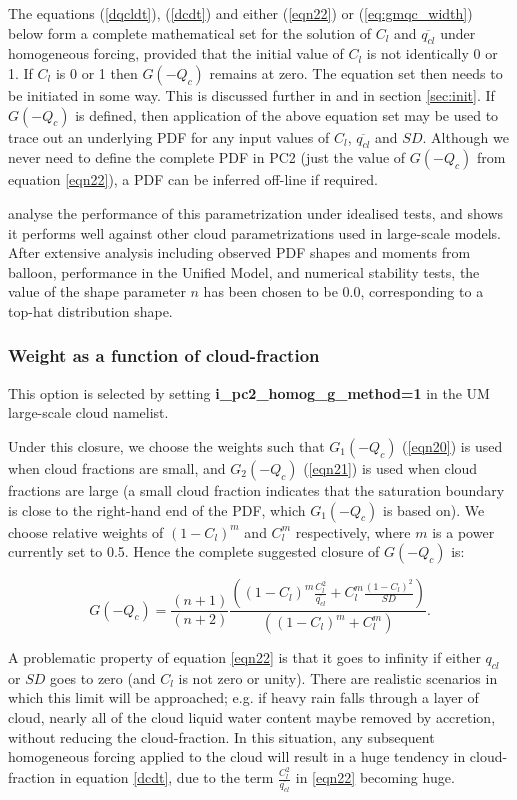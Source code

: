 \documentclass{UMDP_article}
\begin{document}
The equations (\ref{dqcldt}), (\ref{dcdt}) and  either (\ref{eqn22})
or (\ref{eq:gmqc_width}) below form a
complete mathematical set for the solution of $C_l$ and $\overline{q_{cl}}$
under homogeneous forcing, provided that the initial value of $C_l$ is not
identically 0 or 1. If $C_l$ is 0 or 1 then $G(-Q_c)$ remains at zero. The
equation set then needs to be initiated in some way. This is discussed further
in \cite{wg03} and in section \ref{sec:init}. If $G(-Q_c)$ is defined,
then application of the above equation set may be used to trace out an
underlying PDF for any input values of $C_l$, $\overline{q_{cl}}$ and $SD$.
Although we never need to define the complete PDF in PC2 (just the
value of $G(-Q_c)$ from equation \ref{eqn22}), a PDF can be
inferred off-line if required.

\cite{wg03} analyse the performance of this parametrization
under idealised tests, and shows it performs well against other
cloud parametrizations used in large-scale models. After extensive
analysis including observed PDF shapes and moments from balloon,
performance in the Unified Model, and numerical stability tests,
the value of the
shape parameter $n$ has been chosen to be 0.0, corresponding to a
top-hat distribution shape.

\subsubsection{Weight as a function of cloud-fraction}

This option is selected by setting \textbf{i\_pc2\_homog\_g\_method=1}
in the UM large-scale cloud namelist.

Under this closure, we choose the weights such that $G_1(-Q_c)$ (\ref{eqn20})
is used when cloud fractions are small, and $G_2(-Q_c)$ (\ref{eqn21})
is used when cloud fractions are large
(a small cloud fraction indicates that the saturation boundary
is close to the right-hand end of the PDF, which $G_1(-Q_c)$ is based on). 
We choose relative weights of ${{(1-C_l)}^{m}}$
and ${C_l^m }$
respectively, where $m$ is a power currently set to 0.5.
Hence the complete suggested closure of $G(-Q_c)$ is: 

\begin{equation}
{G(-Q_c) = {\frac{(n+1)}{(n+2)}} {\frac{ ( {( 1-C_l )}^m {\frac{C_l^2}
{\overline{q_{cl}}}} + C_l^m
{\frac{{(1-C_l)}^2}{SD}} ) }{( {(1-C_l)}^m + C_l^m ) }} . }
\label{eqn22}
\end{equation}

A problematic property of equation \ref{eqn22} is that it goes to infinity
if either $q_{cl}$ or $SD$ goes to zero (and $C_l$ is not zero or unity).
There are realistic scenarios in which this limit will be approached;
e.g. if heavy rain falls through a layer of cloud, nearly all of the
cloud liquid water content maybe removed by accretion, without reducing
the cloud-fraction.  In this situation, any subsequent homogeneous forcing
applied to the cloud will result in a huge tendency in cloud-fraction
in equation \ref{dcdt}, due to the term
$\frac{C_l^2}{\overline{q_{cl}}}$ in \ref{eqn22} becoming huge.
\end{document}
